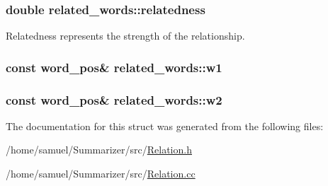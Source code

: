 \subsubsection[{relatedness}]{\setlength{\rightskip}{0pt plus 5cm}double related\+\_\+words\+::relatedness}\label{structrelated__words_aefbff0c852fe59008f43f2c921b42330}


Relatedness represents the strength of the relationship. 

\hypertarget{structrelated__words_a442442bc95c4964a943f0d60c3a0eb30}{}
\subsubsection[{w1}]{\setlength{\rightskip}{0pt plus 5cm}const {\bf word\+\_\+pos}\& related\+\_\+words\+::w1}\label{structrelated__words_a442442bc95c4964a943f0d60c3a0eb30}
\hypertarget{structrelated__words_a183d95179fe2892922bcd9485b48989f}{}
\subsubsection[{w2}]{\setlength{\rightskip}{0pt plus 5cm}const {\bf word\+\_\+pos}\& related\+\_\+words\+::w2}\label{structrelated__words_a183d95179fe2892922bcd9485b48989f}


The documentation for this struct was generated from the following files\+:\begin{DoxyCompactItemize}
\item 
/home/samuel/\+Summarizer/src/\hyperlink{Relation_8h}{Relation.\+h}\item 
/home/samuel/\+Summarizer/src/\hyperlink{Relation_8cc}{Relation.\+cc}\end{DoxyCompactItemize}
